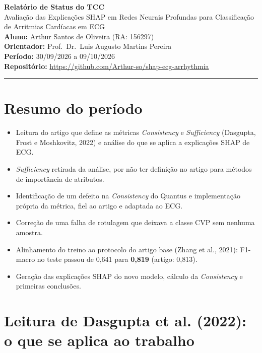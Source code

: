 \documentclass[11pt,a4paper]{article}
\begin{document}
\begin{center}
    {\LARGE \textbf{Relatório de Status do TCC}} \\[0.35em]
    {\large Avaliação das Explicações SHAP em Redes Neurais Profundas para Classificação de Arritmias Cardíacas em ECG} \\[0.3em]
    \textbf{Aluno:} Arthur Santos de Oliveira (RA: 156297) \\[0.2em]
    \textbf{Orientador:} Prof.\ Dr.\ Luis Augusto Martins Pereira \\[0.2em]
    \textbf{Período:} 30/09/2026 a 09/10/2026 \\[0.2em]
    \textbf{Repositório:} \url{https://github.com/Arthur-so/shap-ecg-arrhythmia}
\end{center}
\vspace{-0.5em}
\hrule
\vspace{0.8em}

\section{Resumo do período}

\begin{itemize}
    \item Leitura do artigo que define as métricas \textit{Consistency} e \textit{Sufficiency} (Dasgupta, Frost e Moshkovitz, 2022) e análise do que se aplica a explicações SHAP de ECG.
    \item \textit{Sufficiency} retirada da análise, por não ter definição no artigo para métodos de importância de atributos.
    \item Identificação de um defeito na \textit{Consistency} do Quantus e implementação própria da métrica, fiel ao artigo e adaptada ao ECG.
    \item Correção de uma falha de rotulagem que deixava a classe CVP sem nenhuma amostra.
    \item Alinhamento do treino ao protocolo do artigo base (Zhang et al., 2021): F1-macro no teste passou de 0,641 para \textbf{0,819} (artigo: 0,813).
    \item Geração das explicações SHAP do novo modelo, cálculo da \textit{Consistency} e primeiras conclusões.
\end{itemize}

\section{Leitura de Dasgupta et al. (2022): o que se aplica ao trabalho}
\end{document}
